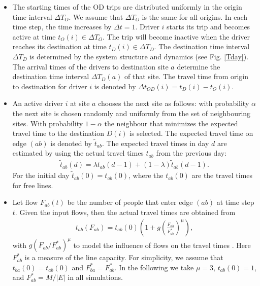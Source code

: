 \documentclass[aps,preprint]{revtex4-1}
\begin{document}
\begin{itemize}

\item The starting times of the OD trips are distributed uniformly in the origin time interval $\Delta T_O$. We assume that $\Delta T_O$ is the same for all origins. In each time step, the time increases by $\Delta t=1$. Driver $i$ starts its trip and becomes active at time $t_O(i) \in \Delta T_O$. The trip will become inactive when the driver reaches its destination at time $t_D(i) \in \Delta T_D$. The destination time interval $\Delta T_D$ is determined by the system structure and dynamics (see Fig. \ref{Tday}). 
The arrival times of the drivers to destination site $a$ determine the destination time interval $\Delta T_D(a)$ of that site. 
The travel time from origin to destination for driver $i$ is denoted by $\Delta t_{OD}(i)=t_D(i)-t_O(i)$. 

\item An active driver $i$ at site $a$ chooses the next site as follows: with probability $\alpha$ the next site is chosen randomly and uniformly from the set of neighbouring sites. With probability $1-\alpha$ the neighbour that minimizes the expected travel time to the destination $D(i)$ is selected. The expected travel time on edge $(ab)$ is denoted by $\tilde{t}_{ab}$. The expected travel times in day $d$ are estimated by using the actual travel times $t_{ab}$ from the previous day:
\begin{align}\label{tab0}
\tilde{t}_{ab}(d)=\lambda t_{ab}(d-1)+(1-\lambda) \tilde{t}_{ab}(d-1).
\end{align}
For the initial day $\tilde{t}_{ab}(0)=t_{ab}(0)$, where the $t_{ab}(0)$ are the travel times for free lines. 

\item Let flow $F_{ab}(t)$ be the number of people that enter edge $(ab)$ at time step $t$. Given the input flows, then the actual travel times are obtained from 
\begin{align}\label{tab}
t_{ab}(F_{ab})=t_{ab}(0)\left(1+g(\frac{F_{ab}}{F_{ab}^*})^{\mu}\right),
\end{align}
with $g (F_{ab}/F_{ab}^*)^{\mu}$ to model the influence of flows on the travel times \cite{BPR-1964,lc-trans-1976,lc-trans-2011}. Here $F_{ab}^*$ is a measure of the line capacity. For simplicity, we assume that $t_{ba}(0)=t_{ab}(0)$ and $F_{ba}^*= F_{ab}^*$.
In the following we take $\mu=3$, $t_{ab}(0)=1$, and $F_{ab}^*=M/|E|$ in all simulations.

\end{itemize}
\end{document}
